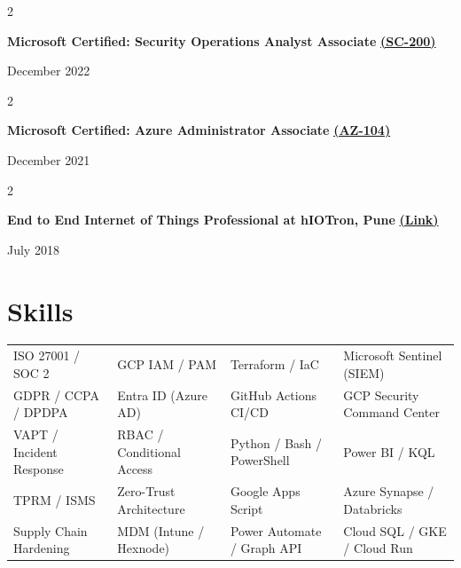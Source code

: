 \documentclass[10pt, letterpaper]{article}
\newenvironment{twocolentry}[2][]{
    \onecolentry
    \def\secondColumn{#2}
    \setcolumnwidth{\fill, 4.5 cm}
    \begin{paracol}{2}
}{
    \switchcolumn \raggedleft \secondColumn
    \end{paracol}
    \endonecolentry
}
\begin{document}
\vspace{0.05 cm}
\begin{twocolentry}{December 2022}
    \textbf{Microsoft Certified: Security Operations Analyst Associate} \href{https://learn.microsoft.com/en-us/users/ChinmayDhokMAQSoftware-5822/credentials/E22E4108C28D9FF2}{\textbf{(SC-200)}}
\end{twocolentry}

\vspace{0.05 cm}
\begin{twocolentry}{December 2021}
    \textbf{Microsoft Certified: Azure Administrator Associate} \href{https://learn.microsoft.com/en-us/users/chinmaydhokmaqsoftware-5822/credentials/ccf1857230b93a53}{\textbf{(AZ-104)}}
\end{twocolentry}

\vspace{0.05 cm}
\begin{twocolentry}{July 2018}
    \textbf{End to End Internet of Things Professional at hIOTron, Pune} \href{https://drive.google.com/file/d/1TszTWmW1DkZhw1jVyjv3x0MUVGfYMrgD/view?usp=sharing}{\textbf{(Link)}}
\end{twocolentry}


\section*{Skills}

\vspace{0.2cm}

\noindent\begin{tabularx}{\textwidth}{@{} >{\raggedright\arraybackslash}X >{\raggedright\arraybackslash}X >{\raggedright\arraybackslash}X >{\raggedright\arraybackslash}X @{}}
ISO 27001 / SOC 2         & GCP IAM / PAM              & Terraform / IaC            & Microsoft Sentinel (SIEM) \\
GDPR / CCPA / DPDPA       & Entra ID (Azure AD)        & GitHub Actions CI/CD       & GCP Security Command Center \\
VAPT / Incident Response  & RBAC / Conditional Access   & Python / Bash / PowerShell & Power BI / KQL \\
TPRM / ISMS               & Zero-Trust Architecture     & Google Apps Script         & Azure Synapse / Databricks \\
Supply Chain Hardening    & MDM (Intune / Hexnode)      & Power Automate / Graph API & Cloud SQL / GKE / Cloud Run \\
\end{tabularx}
\end{document}
